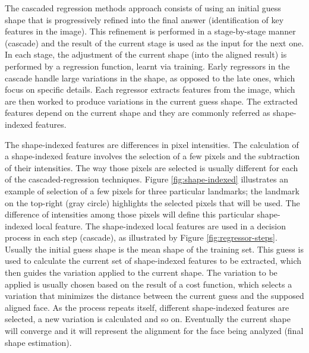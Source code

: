 The cascaded regression methods approach consists of using an initial guess shape that is progressively refined into the final answer (identification of key features in the image). This refinement is performed in a stage-by-stage manner (cascade) and the result of the current stage is used as the input for the next one. In each stage, the adjustment of the current shape (into the aligned result) is performed by a regression function, learnt via training. Early regressors in the cascade handle large variations in the shape, as opposed to the late ones, which focus on specific details. Each regressor extracts features from the image, which are then worked to produce variations in the current guess shape. The extracted features depend on the current shape and they are commonly referred as shape-indexed features.

The shape-indexed features are differences in pixel intensities. The calculation of a shape-indexed feature involves the selection of a few pixels and the subtraction of their intensities. The way those pixels are selected is usually different for each of the cascaded-regression techniques. Figure \ref{fig:shape-indexed} illustrates an example of selection of a few pixels for three particular landmarks; the landmark on the top-right (gray circle) highlights the selected pixels that will be used. The difference of intensities among those pixels will define this particular shape-indexed local feature. The shape-indexed local features are used in a decision process in each step (cascade), as illustrated by Figure \ref{fig:regressor-steps}. Usually the initial guess shape is the mean shape of the training set. This guess is used to calculate the current set of shape-indexed features to be extracted, which then guides the variation applied to the current shape. The variation to be applied is usually chosen based on the result of a cost function, which selects a variation that minimizes the distance between the current guess and the supposed aligned face. As the process repeats itself, different shape-indexed features are selected, a new variation is calculated and so on. Eventually the current shape will converge and it will represent the alignment for the face being analyzed (final shape estimation).


